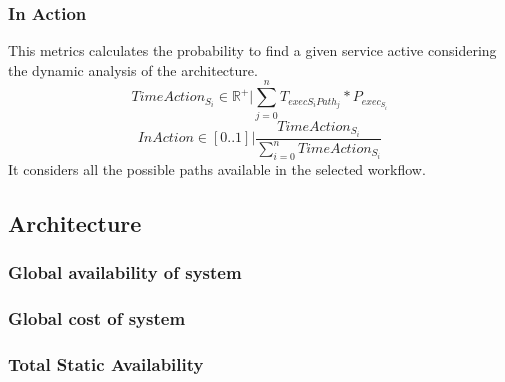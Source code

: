 \subsubsection{In Action}
This metrics calculates the probability to find a given service active considering the dynamic analysis of the architecture.
\[ TimeAction_{S_i} \in \mathbb{R}^+ | \sum_{j=0}^{n} T_{exec{S_i}Path_j} * P_{exec_{S_i}} \]
\[ InAction \in [0..1] | \frac{TimeAction_{S_i}}{{\sum_{i=0}^n}TimeAction_{S_i}} \]
It considers all the possible paths available in the selected workflow.

\subsection{Architecture}
\subsubsection{Global availability of system}
\subsubsection{Global cost of system}
\subsubsection{Total Static Availability}